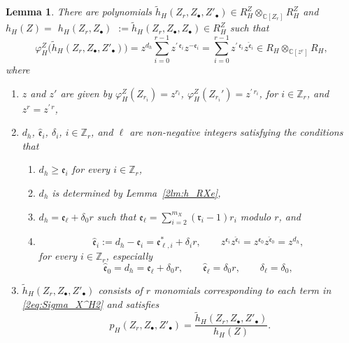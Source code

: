 \documentclass[pdftex]{sigma}
\def\CC{{\mathbb C}}
\def\ZZ{{\mathbb Z}}
\def\fe{{\mathfrak e}}
\def\fr{{\mathfrak r}}
\def\th{{\widetilde h}}
\def\hfe{{\widehat{\mathfrak e}}}
\numberwithin{equation}{section}
\newtheorem{Lemma}[Theorem]{Lemma}
\begin{document}
\begin{Lemma}\label{2lm:h_H}
There are polynomials $\th_{H}(Z_r, Z_\bullet, Z'_\bullet)\in R_H^Z \otimes_{\CC[Z_r]} R_H^Z$ and $h_H(Z)=$ $h_H(Z_r, Z_\bullet)$ $:= \th_{H}(Z_r, Z_\bullet, Z_\bullet)\in R_H^Z$ such that
\begin{equation}
\varphi_H^Z\big(\th_{H}(Z_r, Z_\bullet, Z'_\bullet)\big)=z^{d_h}\sum_{i=0}^{r-1}
z^{\prime\,\fe_i }z^{-\fe_i}=\sum_{i=0}^{r-1}z^{\prime\,\fe_i }z^{\hfe_i}
\in R_H \otimes_{\CC[z^r]} R_H,\label{2eq:Sigma_X^H2}
\end{equation}
where
\begin{enumerate}\itemsep=0pt
\item[$(1)$] $z$ and $z'$ are given by $\varphi_H^Z(Z_{r_i})=z^{r_i}$, $\varphi_H^Z(Z_{r_i}')=z^{\prime\, r_i}$, for $i \in \ZZ_r$, and $z^r = z^{\prime\, r}$,
\item[$(2)$] $d_h$, $\hfe_i$, $\delta_i$, $i\in \ZZ_r$, and $\ell$ are non-negative integers satisfying the conditions that
\begin{enumerate}\itemsep=0pt
\item[$(a)$] $d_h \ge \fe_i$ for every $i\in\ZZ_r$,
\item[$(b)$] $d_h$ is determined by Lemma~{\rm \ref{2lm:h_RXe}},
\item[$(c)$] $d_h = \fe_\ell+ \delta_0 r$ such that $\fe_\ell = \sum_{i=2}^{m_X} (\fr_i-1)r_i$ modulo $r$, and
\item[$(d)$]
\begin{equation}
\hfe_i:=d_h - \fe_i=\fe_{\ell,i}^*+\delta_i r,\qquad
z^{\fe_i}z^{\hfe_i}=z^{\fe_0}z^{\hfe_0}=z^{d_h},\label{2eq:hfe}
\end{equation}
for every $i\in\ZZ_r$, especially
\begin{equation}
\hfe_0 = d_h = \fe_\ell + \delta_0 r, \qquad
\hfe_\ell = \delta_0 r, \qquad \delta_\ell =\delta_0,
\label{2eq:hfe0}
\end{equation}
\end{enumerate}
\item[$(3)$] $\th_{H}(Z_r, Z_\bullet, Z'_\bullet)$ consists of $r$ monomials corresponding to each term in \eqref{2eq:Sigma_X^H2} and satisfies
\begin{equation}
p_{H}(Z_r, Z_\bullet, Z'_\bullet)=\frac{\th_{H}(Z_r, Z_\bullet, Z'_\bullet)}{h_H(Z)}.\label{2eq:hfe2}
\end{equation}
\end{enumerate}
\end{Lemma}
\end{document}
